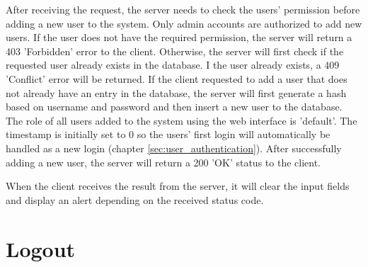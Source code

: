 After receiving the request, the server needs to check the users' permission before adding a new user to the system. Only admin accounts are authorized to add new users. If the user does not have the required permission, the server will return a 403 'Forbidden' error to the client. Otherwise, the server will first check if the requested user already exists in the database.  I the user already exists, a 409 'Conflict' error will be returned. If the client requested to add a user that does not already have an entry in the database,  the server will first generate a hash based on username and password and then insert a new user to the database. The role of all users added to the system using the web interface is 'default'. The timestamp is initially set to 0 so the users' first login will automatically be handled as a new login (chapter \ref{sec:user_authentication}). After successfully adding a new user, the server will return a 200 'OK' status to the client.

When the client receives the result from the server, it will clear the input fields and display an alert depending on the received status code.



\section{Logout}
\label{sec:logout}
